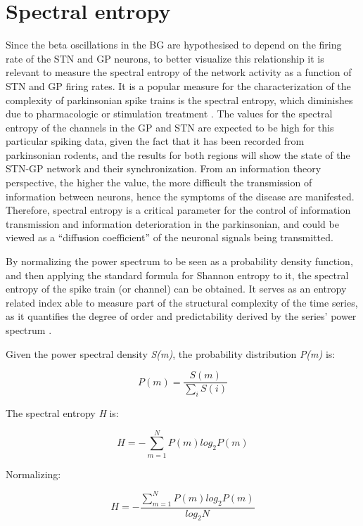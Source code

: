 \documentclass{kththesis}
\begin{document}
\section{Spectral entropy}

Since the beta oscillations in the BG are hypothesised to depend on the firing rate of the STN and GP neurons, to better visualize this relationship it is relevant to measure the spectral entropy of the network activity as a function of STN and GP firing rates. 
It is a popular measure for the characterization of the complexity of parkinsonian spike trains is the spectral entropy, which diminishes due to pharmacologic or stimulation treatment \parencite{Andres}. 
The values for the spectral entropy of the channels in the GP and STN are expected to be high for this particular spiking data, given the fact that it has been recorded from parkinsonian rodents, and the results for both regions will show the state of the STN-GP network and their synchronization. From an information theory perspective, the higher the value, the more difficult the transmission of information between neurons, hence the symptoms of the disease are manifested. Therefore, spectral entropy is a critical parameter for the control of information transmission and information deterioration in the parkinsonian, and could be viewed as a “diffusion coefficient” of the neuronal signals being transmitted.

By normalizing the power spectrum to be seen as a probability density function, and then applying the standard formula for Shannon entropy to it, the spectral entropy of the spike train (or channel) can be obtained. 
It serves as an entropy related index able to measure part of the structural complexity of the time series, as it quantifies the degree of order and predictability derived by the series' power spectrum \parencite{Zacca}.

Given the power spectral density \textit{S(m)}, the probability distribution \textit{P(m)} is:

\begin{equation}
P(m) = \frac{S(m)}{\sum_i S(i)}
\end{equation}

The spectral entropy \textit{H} is:

\begin{equation}
H = -\sum_{m=1}^N P(m) log_2 P(m)
\end{equation}

Normalizing:

\begin{equation}
H = -\frac{\sum_{m=1}^N P(m) log_2 P(m)}{log_2 N}
\end{equation}
\end{document}
